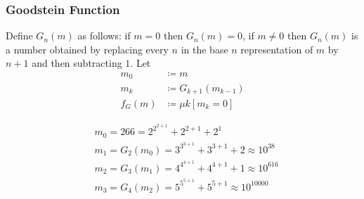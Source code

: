 \documentclass[UTF8,aspectratio=43,11pt,colorlinks,compress,openany]{beamer}%
\begin{document}
\begin{frame}\frametitle{Goodstein Function}
\setlength\abovedisplayskip{0pt}
\setlength\belowdisplayskip{0pt}
	\begin{definition}
		Define $G_n(m)$ as follows: if $m=0$ then $G_n(m)=0$, if $m\neq 0$ then $G_n(m)$ is a number obtained by replacing every $n$ in the base $n$ representation of $m$ by $n + 1$ and then subtracting $1$. Let
		\begin{align*}
		m_0&\coloneqq m\\
		m_k&\coloneqq G_{k+1}(m_{k-1})\\
		f_G(m)&\coloneqq \mu k[m_k=0]
		\end{align*}
	\end{definition}
	\begin{align*}
	&m_0=266=2^{2^{2+1}}+2^{2+1}+2^1\\
	&m_1=G_2(m_0)=3^{3^{3+1}}+3^{3+1}+2\approx 10^{38}\\
	&m_2=G_3(m_1)=4^{4^{4+1}}+4^{4+1}+1\approx 10^{616}\\
	&m_3=G_4(m_2)=5^{5^{5+1}}+5^{5+1}\approx 10^{10000}
	\end{align*}
\end{frame}
\end{document}
